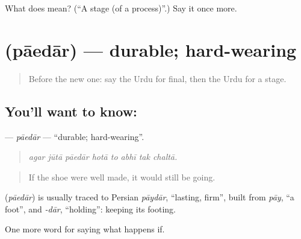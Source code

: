 \begin{tcolorbox}[breakable,colback=teal!4,colframe=teal!35!black,title={Before you move on}]
What does  mean? (\textquotedblleft{}A stage (of a process)\textquotedblright{}.) Say it once more.
\end{tcolorbox}
\section[\texorpdfstring{\ur{پائیدار} (pāedār)}{پائیدار (pāedār)}]{ (pāedār) — durable; hard-wearing}

\label{lesson:UR-C545-paedar}



\begin{quote}
Before the new one: say the Urdu for final, then the Urdu for a stage.
\end{quote}

\subsection*{You'll want to know: }
\textbf{} — \emph{pāedār} — \textquotedblleft{}durable; hard-wearing\textquotedblright{}.

\begin{quote}
       
\end{quote}

\begin{quote}
\emph{agar jūtā pāedār hotā to abhī tak chaltā.}
\end{quote}

\begin{quote}
If the shoe were well made, it would still be going.
\end{quote}

\begin{cousinweb}
\textbf{} (\emph{pāedār}) is usually traced to Persian \emph{pāydār}, \textquotedblleft{}lasting, firm\textquotedblright{}, built from \emph{pāy}, \textquotedblleft{}a foot\textquotedblright{}, and \emph{-dār}, \textquotedblleft{}holding\textquotedblright{}: keeping its footing.
\end{cousinweb}

\begin{grammarlens}[title={What you've built}]
One more word for saying what happens if.
\end{grammarlens}

